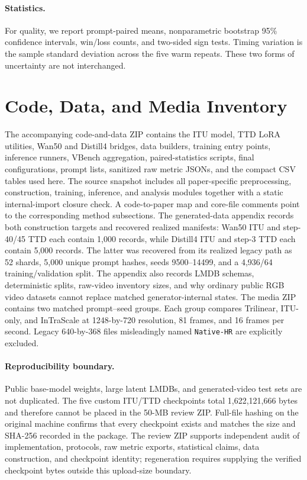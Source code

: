 \documentclass[letterpaper]{article}
\begin{document}
\paragraph{Statistics.}
For quality, we report prompt-paired means, nonparametric bootstrap 95\%
confidence intervals, win/loss counts, and two-sided sign tests.  Timing
variation is the sample standard deviation across the five warm repeats.
These two forms of uncertainty are not interchanged.

\section{Code, Data, and Media Inventory}

The accompanying code-and-data ZIP contains the ITU model, TTD LoRA utilities,
Wan50 and Distill4 bridges, data builders, training entry points, inference
runners, VBench aggregation, paired-statistics scripts, final configurations,
prompt lists, sanitized raw metric JSONs, and the compact CSV tables used here.
The source snapshot includes all paper-specific preprocessing, construction,
training, inference, and analysis modules together with a static internal-import
closure check.  A code-to-paper map and core-file comments point to the
corresponding method subsections.  The generated-data appendix records both
construction targets and recovered realized manifests: Wan50 ITU and
step-40/45 TTD each contain 1,000 records, while Distill4 ITU and step-3 TTD
each contain 5,000 records.  The latter was recovered from its realized legacy
path as 52 shards, 5,000 unique prompt hashes, seeds 9500--14499, and a
4,936/64 training/validation split.  The appendix also records LMDB schemas,
deterministic splits, raw-video inventory sizes, and why ordinary public RGB
video datasets cannot replace matched generator-internal states.
The media ZIP contains two matched prompt--seed groups.  Each group compares
Trilinear, ITU-only, and InTraScale at 1248-by-720 resolution, 81 frames, and
16 frames per second.  Legacy 640-by-368 files misleadingly named
\texttt{Native-HR} are explicitly excluded.

\paragraph{Reproducibility boundary.}
Public base-model weights, large latent LMDBs, and generated-video test sets are
not duplicated.  The five custom ITU/TTD checkpoints total 1,622,121,666 bytes
and therefore cannot be placed in the 50-MB review ZIP.  Full-file hashing on
the original machine confirms that every checkpoint exists and matches the
size and SHA-256 recorded in the package.  The review ZIP supports independent
audit of implementation, protocols, raw metric exports, statistical claims,
data construction, and checkpoint identity; regeneration requires supplying
the verified checkpoint bytes outside this upload-size boundary.
\end{document}
